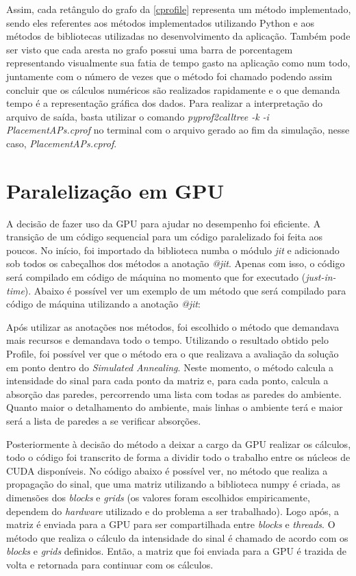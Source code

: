 \documentclass[
	12pt,				%
	twoside,			%
	a4paper,			%
	english,			%
	french,				%
	spanish,			%
	brazil				%
	]{abntex2}
\begin{document}
Assim, cada retângulo do grafo da \autoref{cprofile} representa um
método implementado, sendo eles referentes aos métodos implementados
utilizando Python e aos métodos de bibliotecas utilizadas no
desenvolvimento da aplicação. Também pode ser visto que cada aresta no
grafo possui uma barra de porcentagem representando visualmente sua
fatia de tempo gasto na aplicação como num todo, juntamente com o número
de vezes que o método foi chamado podendo assim concluir que os cálculos
numéricos são realizados rapidamente e o que demanda tempo é a
representação gráfica dos dados. Para realizar a interpretação do
arquivo de saída, basta utilizar o comando \emph{pyprof2calltree -k -i
PlacementAPs.cprof} no terminal com o arquivo gerado ao fim da
simulação, nesse caso, \emph{PlacementAPs.cprof}.

\section{Paralelização em GPU}\label{paralelizauxe7uxe3o-em-gpu}

A decisão de fazer uso da GPU para ajudar no desempenho foi eficiente. A
transição de um código sequencial para um código paralelizado foi feita
aos poucos. No início, foi importado da biblioteca numba o módulo
\emph{jit} e adicionado sob todos os cabeçalhos dos métodos a anotação
\emph{@jit}. Apenas com isso, o código será compilado em código de
máquina no momento que for executado (\emph{just-in-time}). Abaixo é
possível ver um exemplo de um método que será compilado para código de
máquina utilizando a anotação \emph{@jit}:



Após utilizar as anotações nos métodos, foi escolhido o método que
demandava mais recursos e demandava todo o tempo. Utilizando o resultado
obtido pelo Profile, foi possível ver que o método era o que realizava a
avaliação da solução em ponto dentro do \emph{Simulated Annealing}.
Neste momento, o método calcula a intensidade do sinal para cada ponto
da matriz e, para cada ponto, calcula a absorção das paredes,
percorrendo uma lista com todas as paredes do ambiente. Quanto maior o
detalhamento do ambiente, mais linhas o ambiente terá e maior será a
lista de paredes a se verificar absorções.

Posteriormente à decisão do método a deixar a cargo da GPU realizar os
cálculos, todo o código foi transcrito de forma a dividir todo o
trabalho entre os núcleos de CUDA disponíveis. No código abaixo é
possível ver, no método que realiza a propagação do sinal, que uma
matriz utilizando a biblioteca numpy é criada, as dimensões dos
\emph{blocks} e \emph{grids} (os valores foram escolhidos empiricamente,
dependem do \emph{hardware} utilizado e do problema a ser trabalhado).
Logo após, a matriz é enviada para a GPU para ser compartilhada entre
\emph{blocks} e \emph{threads}. O método que realiza o cálculo da
intensidade do sinal é chamado de acordo com os \emph{blocks} e
\emph{grids} definidos. Então, a matriz que foi enviada para a GPU é
trazida de volta e retornada para continuar com os cálculos.
\end{document}
